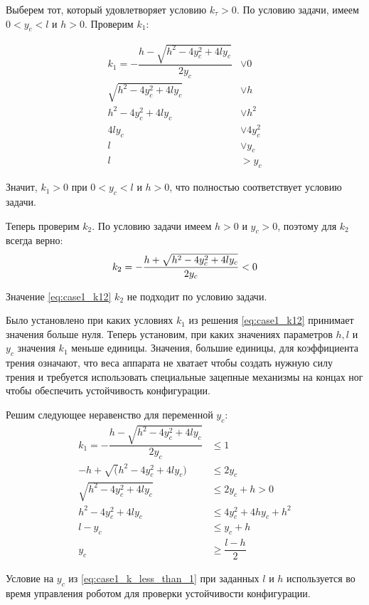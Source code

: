 Выберем тот, который удовлетворяет условию $k_\tau > 0$. По условию задачи, имеем $0 < y_c < l$ и $h > 0$. Проверим $k_1$:

\[
\begin{alignedat}{3}
  k_1 = - \dfrac{h - \sqrt{h^2 - 4y_c^2+4ly_c}}{2y_c} &\vee 0 \\
  \sqrt{h^2 - 4y_c^2+4ly_c} &\vee h\\
  h^2 - 4y_c^2+4ly_c &\vee h^2 \\
  4ly_c &\vee 4y_c^2 \\
  l &\vee y_c\\
  l &> y_c
\end{alignedat}
\]

Значит, $k_1 > 0$ при $0 < y_c < l$ и $h > 0$, что полностью соответствует условию  задачи.



Теперь проверим $k_2$. По условию задачи имеем $h > 0$ и $y_c > 0$, поэтому для $k_2$ всегда верно:
\[
    k_2 = -\dfrac{h + \sqrt{h^2 - 4y_c^2 + 4ly_c}}{2y_c} < 0\\
\]

Значение \ref{eq:case1_k12} $k_2$ не подходит по условию задачи.

Было установлено при каких условиях $k_1$ из решения \ref{eq:case1_k12} принимает значения больше нуля. Теперь установим, при каких значениях параметров $h,l$ и $y_c$ значения $k_1$ меньше единицы. Значения, большие единицы, для коэффициента трения означают, что веса аппарата не хватает чтобы создать нужную силу трения и требуется использовать специальные зацепные механизмы на концах ног чтобы обеспечить устойчивость конфигурации.

Решим следующее неравенство для переменной $y_c$:
\begin{equation}
\label{eq:case1_k_less_than_1}
  \begin{alignedat}{3}
  k_1 = - \dfrac{h - \sqrt{h^2 - 4y_c^2+4ly_c}}{2y_c} & \leq 1 \\
  -h + \sqrt(h^2 - 4y_c^2 + 4ly_c) &\leq 2y_c\\
  \sqrt{h^2 - 4y_c^2 + 4ly_c} &\leq 2y_c + h > 0\\
  h^2 - 4y_c^2 +4ly_c &\leq 4y_c^2 + 4hy_c + h^2\\
  l-y_c &\leq y_c + h\\
  y_c &\ge \dfrac{l-h}{2}
  \end{alignedat}
\end{equation}


Условие на $y_c$ из \ref{eq:case1_k_less_than_1} при заданных $l$ и $h$ используется во время управления роботом для проверки устойчивости конфигурации.



